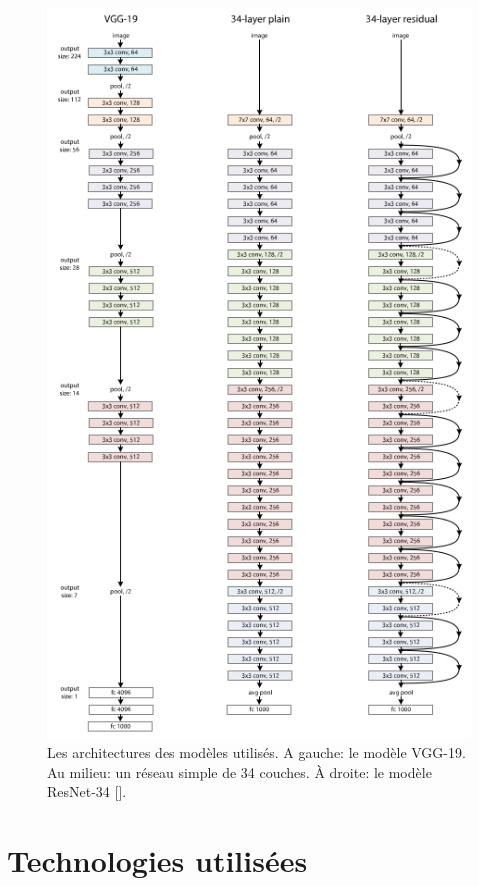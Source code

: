 \begin{figure}[hbt!]
  \centering
  \includegraphics[width=13.5cm]{images_pfe/vgg-19-and-resnet-34.png}
  \caption{Les architectures des modèles utilisés. A gauche: le modèle VGG-19. Au milieu: un réseau simple de 34 couches. À droite: le modèle ResNet-34 [\cite{He_2016_CVPR}].}
  \label{fig:architectures}
\end{figure}
\FloatBarrier
\medskip

\section{Technologies utilisées}
